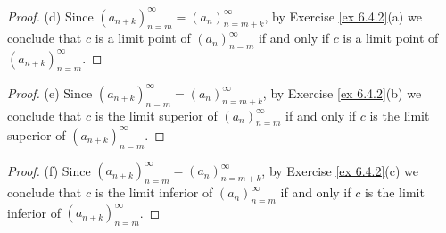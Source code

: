 \begin{proof}{(d)}
Since \((a_{n + k})_{n = m}^\infty = (a_n)_{n = m + k}^\infty\), by Exercise \ref{ex 6.4.2}(a) we conclude that \(c\) is a limit point of \((a_n)_{n = m}^\infty\) if and only if \(c\) is a limit point of \((a_{n + k})_{n = m}^\infty\).
\end{proof}

\begin{proof}{(e)}
Since \((a_{n + k})_{n = m}^\infty = (a_n)_{n = m + k}^\infty\), by Exercise \ref{ex 6.4.2}(b) we conclude that \(c\) is the limit superior of \((a_n)_{n = m}^\infty\) if and only if \(c\) is the limit superior of \((a_{n + k})_{n = m}^\infty\).
\end{proof}

\begin{proof}{(f)}
Since \((a_{n + k})_{n = m}^\infty = (a_n)_{n = m + k}^\infty\), by Exercise \ref{ex 6.4.2}(c) we conclude that \(c\) is the limit inferior of \((a_n)_{n = m}^\infty\) if and only if \(c\) is the limit inferior of \((a_{n + k})_{n = m}^\infty\).
\end{proof}